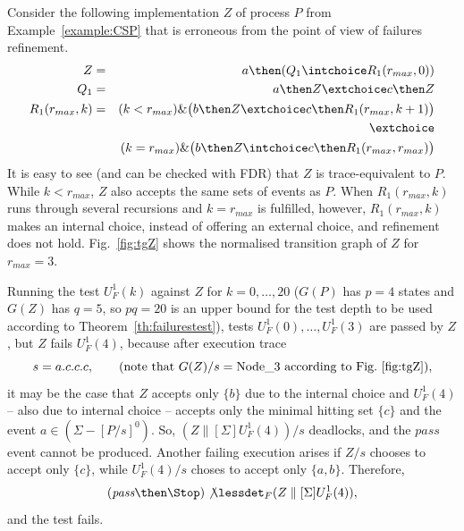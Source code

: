 \begin{example}
\label{ex:uf1tests} Consider the following implementation $Z$ of process $P$
from Example~\ref{example:CSP} that is erroneous from the point of view of
failures refinement.
\begin{eqnarray*}
Z & = & a \then (Q_1 \intchoice R_1(r_{max},0))
\\
Q_1 & = & a\then Z \extchoice c\then Z
\\
R_1(r_{max},k) & = & (k < r_{max}) \& \big(b\then Z \extchoice  c\then R_1(r_{max},k+1)\big)
\\ & & \extchoice
\\ & & (k = r_{max}) \& \big(b\then Z \intchoice c\then R_1(r_{max},r_{max})\big)
\end{eqnarray*}
It is easy to see (and can be checked with FDR) that $Z$ is trace-equivalent
to $P$. While $k < r_{max}$, $Z$ also accepts the same sets of events as $P$.
When $R_1(r_{max},k)$ runs through several recursions and $k = r_{max}$ is
fulfilled, however, $R_1(r_{max},k)$ makes an internal choice, instead of
offering an external choice, and refinement does not hold.
Fig.~\ref{fig:tgZ} shows the normalised transition graph of $Z$ for $r_{max}
= 3$.

Running the test $U_F^1(k)$ against $Z$ for $k=0,\dots,20$ ($G(P)$ has $p =
4$ states and $G(Z)$ has $q=5$, so $pq=20$ is an upper bound for the test
depth to be used according to Theorem~\ref{th:failurestest}), tests
$U_F^1(0),\dots, U_F^1(3)$ are passed by $Z$, but $Z$ fails $U_F^1(4)$,
because after  execution trace
\[
s = a.c.c.c, \qquad\text{(note that $G(Z)/s = \text{Node\_3}$ according to Fig.~\ref{fig:tgZ})},
\]
it may be the case that $Z$ accepts only $\{b\}$ due to the internal choice
and $U_F^1(4)$ -- also due to internal choice -- accepts only the minimal
hitting set $\{ c \}$ and the event $a\in (\Sigma - [P/s]^0)$. So,
$(Z\parallel[\Sigma] U_F^1(4))/s$ deadlocks, and the $pass$ event cannot be
produced. Another failing execution arises if $Z/s$ chooses to accept only
$\{c \}$, while $U_F^1(4)/s$ choses to accept only $\{a,b\}$. Therefore,
\[
(\epass\then \Stop)\not\lessdet_F  (Z\parallel[\Sigma] U_F^1(4)),
\]
and the test fails.
\xbox
\end{example}

